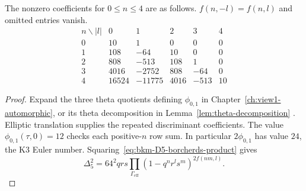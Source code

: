 \begin{proposition}
\label{prop:bkm-higher-order-fourier}
The nonzero coefficients for $0\leq n\leq4$ are as follows.
$f(n,-l)=f(n,l)$ and omitted entries vanish.
\[
\begin{array}{c|rrrrr}
 n\backslash |l|&0&1&2&3&4\\\hline
 0&10&1&0&0&0\\
 1&108&-64&10&0&0\\
 2&808&-513&108&1&0\\
 3&4016&-2752&808&-64&0\\
 4&16524&-11775&4016&-513&10
\end{array}
\]
\end{proposition}
\begin{proof}
Expand the three theta quotients defining $\phi_{0,1}$ in
Chapter~\ref{ch:view1-automorphic}, or its theta decomposition in
Lemma~\ref{lem:theta-decomposition} \cite{EZ:1}. Elliptic translation supplies
the repeated discriminant coefficients. The value
$\phi_{0,1}(\tau,0)=12$ checks each positive-$n$ row sum.
In particular $2\phi_{0,1}$ has value $24$, the K3 Euler number.
Squaring~\eqref{eq:bkm-D5-borcherds-product} gives
\[
 \Delta_5^2=64^2qrs
 \prod_{\Gamma_{\mathrm{eff}}}(1-q^nr^ls^m)^{2f(nm,l)}.
\]
\end{proof}

